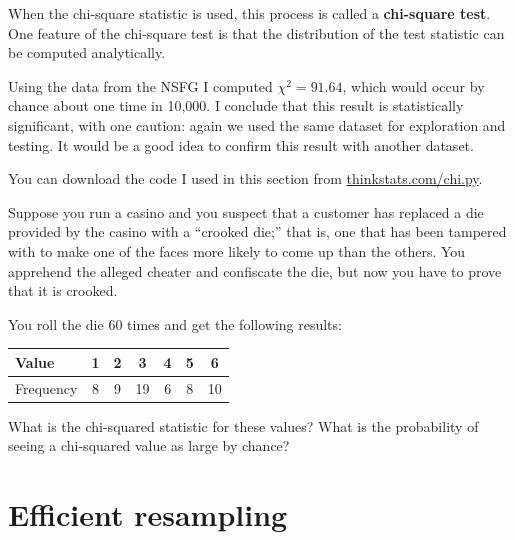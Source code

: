 \documentclass[12pt]{book}
\begin{document}
When the chi-square statistic is used, this process is called a 
{\bf chi-square test}.  One feature of the chi-square test is that
the distribution of the test statistic can be computed analytically.


Using the data from the NSFG I computed $\chi^2 = 91.64$, which would
occur by chance about one time in 10,000.  I conclude that this result
is statistically significant, with one caution: again we used the
same dataset for exploration and testing.  It would be a good idea
to confirm this result with another dataset.


You can download the code I used in this section from
\url{thinkstats.com/chi.py}.




\begin{ex}


Suppose you run a casino and you suspect that a customer has
replaced a die provided by the casino with a ``crooked die;'' that
is, one that has been tampered with to make one of the faces more
likely to come up than the others.  You apprehend the alleged
cheater and confiscate the die, but now you have to prove that it
is crooked.

You roll the die 60 times and get the following results:

\begin{center}
\begin{tabular}{|l|c|c|c|c|c|c|}
\hline
Value     &  1  &  2  &  3  &  4  &  5  &  6  \\ 
\hline
\hline
Frequency &  8  &  9  &  19  &  6  &  8  &  10  \\
\hline
\end{tabular}
\end{center}

What is the chi-squared statistic for these values?  What is the
probability of seeing a chi-squared value as large by chance?

\end{ex}




\section{Efficient resampling}
\end{document}
